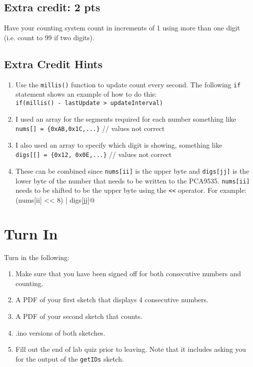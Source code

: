 \subsection{Extra credit: 2 pts}
Have your counting system count in increments of 1 using more than one digit (i.e. count to 99 if two digits).
\subsection{Extra Credit Hints}
\begin{enumerate}
    \item Use the \lstinline|millis()| function to update count every second. The 
            following \lstinline|if| statement shows an example of how to do this: \\
            \lstinline|if(millis() - lastUpdate > updateInterval)|
    \item I used an array for the segments required for each number something like \\
            \lstinline|nums[] = {0xAB,0x1C,...}|  // values not correct
    \item I also used an array to specify which digit is showing, something like \\
            \lstinline|digs[[] = {0x12, 0x0E,...}| // values not correct
    \item These can be combined since \lstinline|nums[ii]| is the upper byte and 
            \lstinline|digs[jj]| is the lower byte of the number that needs to be 
            written to the PCA9535. \lstinline|nums[ii]| needs to be shifted to be 
            the upper byte using the \lstinline|<<| operator. For example: \\
            \lstinline@(nums[ii] << 8) | digs[jj]@ 
\end{enumerate}

\section{Turn In}
Turn in the following:
\begin{enumerate}
    \item Make sure that you have been signed off for both consecutive numbers and counting.
    \item A PDF of your first sketch that displays 4 consecutive numbers.
    \item A PDF of your second sketch that counts.
    \item .ino versions of both sketches.
    \item Fill out the end of lab quiz prior to leaving. Note that it includes asking you 
            for the output of the \lstinline$getIDs$ sketch. 
\end{enumerate}